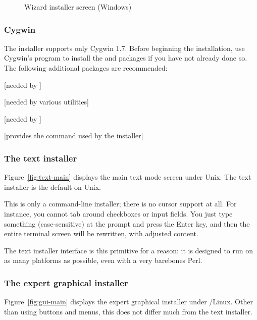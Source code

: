 \documentclass{article}
\begin{document}
\begin{figure}[tb]
\caption{Wizard installer screen (Windows)}\label{fig:wizard-w32}
\end{figure}


\subsubsection{Cygwin}
\label{sec:cygwin}

The \TL{} installer supports only Cygwin 1.7.
Before beginning the installation, use Cygwin's  program to
install the  and  packages if you have
not already done so.  The following additional packages are
recommended:
\begin{itemize*}
\item {} [needed by \XeTeX]
\item {} [needed by various utilities]
\item {} [needed by ]
\item {} [provides the  command used by the installer]
\end{itemize*}


\subsubsection{The text installer}

Figure~\ref{fig:text-main} displays the main text mode screen under
Unix.  The text installer is the default on Unix.

This is only a command-line installer; there is no cursor support at
all.  For instance, you cannot tab around checkboxes or input fields.
You just type something (case-sensitive) at the prompt and press the
Enter key, and then the entire terminal screen will be rewritten, with
adjusted content.

The text installer interface is this primitive for a reason: it
is designed to run on as many platforms as possible, even with a
very barebones Perl.

\subsubsection{The expert graphical installer}

Figure~\ref{fig:gui-main} displays the expert graphical installer under
\GNU/Linux.  Other than using buttons and menus, this does
not differ much from the text installer.
\end{document}
